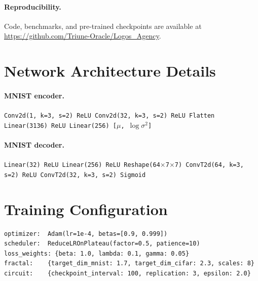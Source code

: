 \documentclass{article}
\begin{document}
\paragraph{Reproducibility.}
Code, benchmarks, and pre-trained checkpoints are available at
\url{https://github.com/Triune-Oracle/Logos_Agency}.




\appendix

\section{Network Architecture Details}
\label{app:arch}

\paragraph{MNIST encoder.}
\texttt{Conv2d(1, k=3, s=2) \textrightarrow{} ReLU
\textrightarrow{} Conv2d(32, k=3, s=2) \textrightarrow{} ReLU
\textrightarrow{} Flatten \textrightarrow{} Linear(3136)
\textrightarrow{} ReLU \textrightarrow{} Linear(256)
[$\mu$, $\log\sigma^2$]}

\paragraph{MNIST decoder.}
\texttt{Linear(32) \textrightarrow{} ReLU
\textrightarrow{} Linear(256) \textrightarrow{} ReLU
\textrightarrow{} Reshape(64$\times$7$\times$7) \textrightarrow{} ConvT2d(64, k=3, s=2)
\textrightarrow{} ReLU \textrightarrow{} ConvT2d(32, k=3, s=2)
\textrightarrow{} Sigmoid}

\section{Training Configuration}
\label{app:training}

\begin{verbatim}
optimizer:  Adam(lr=1e-4, betas=[0.9, 0.999])
scheduler:  ReduceLROnPlateau(factor=0.5, patience=10)
loss_weights: {beta: 1.0, lambda: 0.1, gamma: 0.05}
fractal:    {target_dim_mnist: 1.7, target_dim_cifar: 2.3, scales: 8}
circuit:    {checkpoint_interval: 100, replication: 3, epsilon: 2.0}
\end{verbatim}
\end{document}
